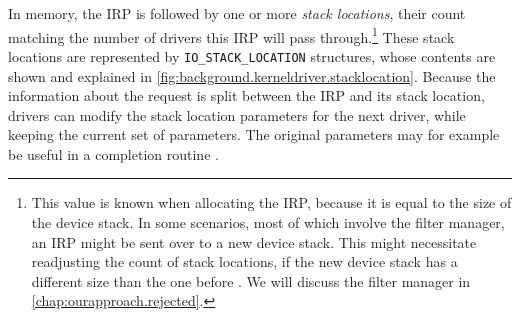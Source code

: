 In memory, the IRP is followed by one or more \emph{stack locations}, their count matching the number of drivers this IRP will pass through.\footnote{\label{fn:background.kerneldriver.adjuststacksize} This value is known when allocating the IRP, because it is equal to the size of the device stack. In some scenarios, most of which involve the filter manager, an IRP might be sent over to a new device stack. This might necessitate readjusting the count of stack locations, if the new device stack has a different size than the one before \cite{Yosifovich2017}. We will discuss the filter manager in \autoref{chap:ourapproach.rejected}.} These stack locations are represented by \texttt{IO\_STACK\_LOCATION} structures, whose contents are shown and explained in \autoref{fig:background.kerneldriver.stacklocation}. Because the information about the request is split between the IRP and its stack location, drivers can modify the stack location parameters for the next driver, while keeping the current set of parameters. The original parameters may for example be useful in a completion routine \cite{Yosifovich2017}.

